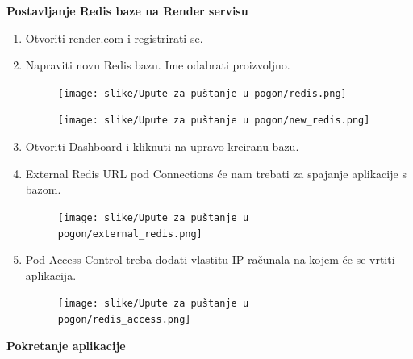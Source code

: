 			\textbf{Postavljanje Redis baze na Render servisu}
			
			\begin{enumerate}
			    \item Otvoriti \href{https://render.com/}{render.com} i registrirati se.
			    \item Napraviti novu Redis bazu. Ime odabrati proizvoljno.
			    
			    \begin{figure}[H]
        			\texttt{[image: slike/Upute za puštanje u pogon/redis.png]}
        			\centering
        		\end{figure}
        		
        		\begin{figure}[H]
        			\texttt{[image: slike/Upute za puštanje u pogon/new\_redis.png]}
        			\centering
        		\end{figure}
        		
        		\item Otvoriti Dashboard i kliknuti na upravo kreiranu bazu.
        		
        		\item External Redis URL pod Connections će nam trebati za spajanje aplikacije s bazom.
        		
        		\begin{figure}[H]
        			\texttt{[image: slike/Upute za puštanje u pogon/external\_redis.png]}
        			\centering
        		\end{figure}
        		
        		\item Pod Access Control treba dodati vlastitu IP računala na kojem će se vrtiti aplikacija.
        		
        		\begin{figure}[H]
        			\texttt{[image: slike/Upute za puštanje u pogon/redis\_access.png]}
        			\centering
        		\end{figure}
			    
			\end{enumerate}
			
			\textbf{Pokretanje aplikacije}
			

